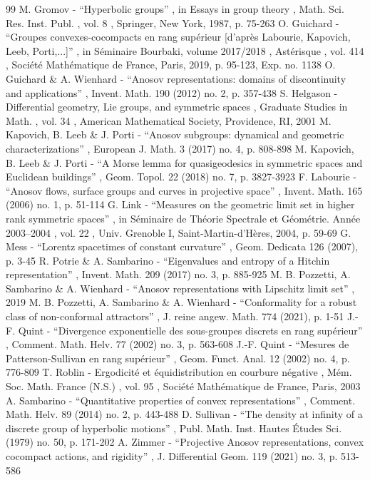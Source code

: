 \documentclass[11pt]{article}
\numberwithin{equation}{section}
\theoremstyle{definition}
\begin{document}
\begin{thebibliography}{99}
 M. Gromov - “Hyperbolic groups” , in Essays in group theory , Math. Sci. Res. Inst. Publ. , vol. 8 , Springer, New York, 1987, p. 75-263
 O. Guichard - “Groupes convexes-cocompacts en rang supérieur [d’après Labourie, Kapovich, Leeb, Porti,...]” , in Séminaire Bourbaki, volume 2017/2018 , Astérisque , vol. 414 , Société Mathématique de France, Paris, 2019, p. 95-123, Exp. no. 1138
 O. Guichard \& A. Wienhard - “Anosov representations: domains of discontinuity and applications” , Invent. Math. 190 (2012) no. 2, p. 357-438
 S. Helgason - Differential geometry, Lie groups, and symmetric spaces , Graduate Studies in Math. , vol. 34 , American Mathematical Society, Providence, RI, 2001
 M. Kapovich, B. Leeb \& J. Porti - “Anosov subgroups: dynamical and geometric characterizations” , European J. Math. 3 (2017) no. 4, p. 808-898
 M. Kapovich, B. Leeb \& J. Porti - “A Morse lemma for quasigeodesics in symmetric spaces and Euclidean buildings” , Geom. Topol. 22 (2018) no. 7, p. 3827-3923
 F. Labourie - “Anosov flows, surface groups and curves in projective space” , Invent. Math. 165 (2006) no. 1, p. 51-114
 G. Link - “Measures on the geometric limit set in higher rank symmetric spaces” , in Séminaire de Théorie Spectrale et Géométrie. Année 2003–2004 , vol. 22 , Univ. Grenoble I, Saint-Martin-d’Hères, 2004, p. 59-69
 G. Mess - “Lorentz spacetimes of constant curvature” , Geom. Dedicata 126 (2007), p. 3-45
 R. Potrie \& A. Sambarino - “Eigenvalues and entropy of a Hitchin representation” , Invent. Math. 209 (2017) no. 3, p. 885-925
 M. B. Pozzetti, A. Sambarino \& A. Wienhard - “Anosov representations with Lipschitz limit set” , 2019
 M. B. Pozzetti, A. Sambarino \& A. Wienhard - “Conformality for a robust class of non-conformal attractors” , J. reine angew. Math. 774 (2021), p. 1-51
 J.-F. Quint - “Divergence exponentielle des sous-groupes discrets en rang supérieur” , Comment. Math. Helv. 77 (2002) no. 3, p. 563-608
 J.-F. Quint - “Mesures de Patterson-Sullivan en rang supérieur” , Geom. Funct. Anal. 12 (2002) no. 4, p. 776-809
 T. Roblin - Ergodicité et équidistribution en courbure négative , Mém. Soc. Math. France (N.S.) , vol. 95 , Société Mathématique de France, Paris, 2003
 A. Sambarino - “Quantitative properties of convex representations” , Comment. Math. Helv. 89 (2014) no. 2, p. 443-488
 D. Sullivan - “The density at infinity of a discrete group of hyperbolic motions” , Publ. Math. Inst. Hautes Études Sci. (1979) no. 50, p. 171-202
 A. Zimmer - “Projective Anosov representations, convex cocompact actions, and rigidity” , J. Differential Geom. 119 (2021) no. 3, p. 513-586
\end{thebibliography}
\end{document}
